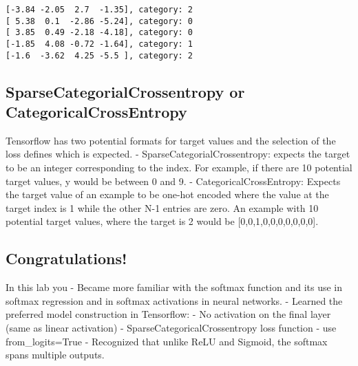 \documentclass[11pt]{article}
\makeatletter
\newcommand{\boxspacing}{\kern\kvtcb@left@rule\kern\kvtcb@boxsep}
\newcommand{\prompt}[4]{
        \ttfamily\llap{{\color{#2}[#3]:\hspace{3pt}#4}}\vspace{-\baselineskip}
    }
\makeatother
\begin{document}
    \begin{Verbatim}[commandchars=\\\{\}]
[-3.84 -2.05  2.7  -1.35], category: 2
[ 5.38  0.1  -2.86 -5.24], category: 0
[ 3.85  0.49 -2.18 -4.18], category: 0
[-1.85  4.08 -0.72 -1.64], category: 1
[-1.6  -3.62  4.25 -5.5 ], category: 2
    \end{Verbatim}

    \hypertarget{sparsecategorialcrossentropy-or-categoricalcrossentropy}{%
\subsection{SparseCategorialCrossentropy or
CategoricalCrossEntropy}\label{sparsecategorialcrossentropy-or-categoricalcrossentropy}}

Tensorflow has two potential formats for target values and the selection
of the loss defines which is expected. - SparseCategorialCrossentropy:
expects the target to be an integer corresponding to the index. For
example, if there are 10 potential target values, y would be between 0
and 9. - CategoricalCrossEntropy: Expects the target value of an example
to be one-hot encoded where the value at the target index is 1 while the
other N-1 entries are zero. An example with 10 potential target values,
where the target is 2 would be {[}0,0,1,0,0,0,0,0,0,0{]}.

    \hypertarget{congratulations}{%
\subsection{Congratulations!}\label{congratulations}}

In this lab you - Became more familiar with the softmax function and its
use in softmax regression and in softmax activations in neural networks.
- Learned the preferred model construction in Tensorflow: - No
activation on the final layer (same as linear activation) -
SparseCategoricalCrossentropy loss function - use from\_logits=True -
Recognized that unlike ReLU and Sigmoid, the softmax spans multiple
outputs.

    \begin{tcolorbox}[breakable, size=fbox, boxrule=1pt, pad at break*=1mm,colback=cellbackground, colframe=cellborder]
\prompt{In}{incolor}{ }{\boxspacing}
\begin{Verbatim}[commandchars=\\\{\}]

\end{Verbatim}
\end{tcolorbox}

    \begin{tcolorbox}[breakable, size=fbox, boxrule=1pt, pad at break*=1mm,colback=cellbackground, colframe=cellborder]
\prompt{In}{incolor}{ }{\boxspacing}
\begin{Verbatim}[commandchars=\\\{\}]

\end{Verbatim}
\end{tcolorbox}


    
    
    
\end{document}
